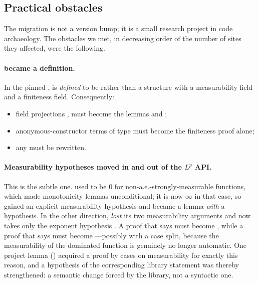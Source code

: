 \subsection{Practical obstacles}
\label{sec:obstacles}

The migration is not a version bump; it is a small research project in code archaeology. The
obstacles we met, in decreasing order of the number of sites they affected, were the
following.

\paragraph{ became a definition.} In the pinned \Mathlib{}, 
is \emph{defined} to be  rather than a structure with a
measurability field and a finiteness field. Consequently:
\begin{itemize}
\item field projections ,  must become the lemmas
       and ;
\item anonymous-constructor terms  of type  must
      become the finiteness proof alone;
\item any  must be rewritten.
\end{itemize}

\paragraph{Measurability hypotheses moved in and out of the \texorpdfstring{$L^p$}{Lp} API.}
This is the subtle one.  used to be $0$ for non-a.e.-strongly-measurable
functions, which made monotonicity lemmas unconditional; it is now $\infty$ in that case,
so  gained an explicit measurability hypothesis and
 became a lemma \emph{with} a hypothesis. In the
other direction,  \emph{lost} its two measurability arguments and now
takes only the exponent hypothesis . A proof that says
 must become
, while a proof that says  must become
---possibly with a case split, because the measurability of the
dominated function is genuinely no longer automatic. One project lemma
() acquired a proof by cases on measurability for exactly
this reason, and a hypothesis of the corresponding library statement was thereby
strengthened: a semantic change forced by the library, not a syntactic one.

